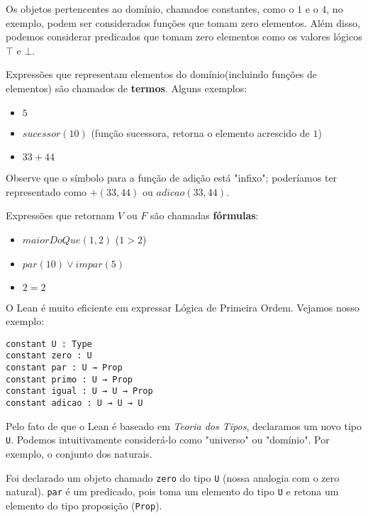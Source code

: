         Os objetos pertencentes ao domínio, chamados constantes, como o $1$ e o $4$, no exemplo, podem ser considerados funções que tomam zero elementos. Além disso, podemos considerar predicados que tomam zero elementos como os valores lógicos $\top$ e $\bot$.

        Expressões que representam elementos do domínio(incluindo funções de elementos) são chamados de \textbf{termos}. Alguns exemplos:

        \begin{itemize}
            \item $5$
            \item $sucessor(10)$ (função sucessora, retorna o elemento acrescido de $1$)
            \item $33+44$
        \end{itemize}

        Observe que o símbolo para a função de adição está "infixo"; poderíamos ter representado como $+(33, 44)$ ou $adicao(33, 44)$.
        
        Expressões que retornam $V$ ou $F$ são chamadas \textbf{fórmulas}:

        \begin{itemize}
            \item $maiorDoQue(1,2)$ ($1 > 2$)
            \item $par(10) \lor impar(5)$
            \item $2=2$
        \end{itemize}

        O Lean é muito eficiente em expressar Lógica de Primeira Ordem. Vejamos nosso exemplo:

        \begin{lstlisting}
constant U : Type
constant zero : U
constant par : U → Prop
constant primo : U → Prop
constant igual : U → U → Prop
constant adicao : U → U → U
\end{lstlisting}

        Pelo fato de que o Lean é baseado em \textit{Teoria dos Tipos}, declaramos um novo tipo \lstinline{U}. Podemos intuitivamente considerá-lo como "universo" ou "domínio". Por exemplo, o conjunto dos naturais.

        Foi declarado um objeto chamado \lstinline{zero} do tipo \lstinline{U} (nossa analogia com o zero natural).
        \lstinline{par} é um predicado, pois toma um elemento do tipo \lstinline{U} e retona um elemento do tipo proposição (\lstinline{Prop}).

